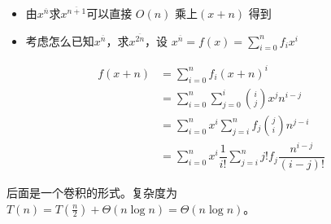 \documentclass[UTF8]{beamer}
\begin{document}
\begin{frame}
    \begin{itemize}
        \item 由$x^{\overline{n}}$求$x^{\overline{n+1}}$可以直接 $O(n)$ 乘上$(x+n)$ 得到
        \item 考虑怎么已知$x^{\overline{n}}$，求$x^{\overline{2n}}$，设 $x^{\overline{n}}=f(x)=\sum_{i=0}^nf_ix^i$
    \end{itemize}

    $$
    \begin{aligned}
    f(x+n)&=\sum\limits_{i=0}^nf_i(x+n)^i\\
    &=\sum\limits_{i=0}^n\sum\limits_{j=0}^i\binom{i}{j}x^jn^{i-j}\\
    &=\sum\limits_{i=0}^nx^i\sum\limits_{j=i}^nf_j\binom{j}{i}n^{j-i}\\
    &=\sum\limits_{i=0}^nx^i\dfrac{1}{i!}\sum\limits_{j=i}^nj!f_j\dfrac{n^{i-j}}{(i-j)!}
    \end{aligned}
    $$


    后面是一个卷积的形式。复杂度为 $T(n) = T(\frac{n}{2})+\Theta (n\log n) = \Theta(n\log n)$。
\end{frame}
\end{document}
